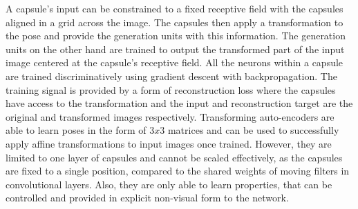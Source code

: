 A capsule's input can be constrained to a fixed receptive field with the capsules aligned in a grid across the image. The capsules then apply a transformation to the pose and provide the generation units with this information. The generation units on the other hand are trained to output the transformed part of the input image centered at the capsule's receptive field. All the neurons within a capsule are trained discriminatively using gradient descent with backpropagation. The training signal is provided by a form of reconstruction loss where the capsules have access to the transformation and the input and reconstruction target are the original and transformed images respectively. Transforming auto-encoders are able to learn poses in the form of $3x3$ matrices and can be used to successfully apply affine transformations to input images once trained. However, they are limited to one layer of capsules and cannot be scaled effectively, as the capsules are fixed to a single position, compared to the shared weights of moving filters in convolutional layers. Also, they are only able to learn properties, that can be controlled and provided in explicit non-visual form to the network.
